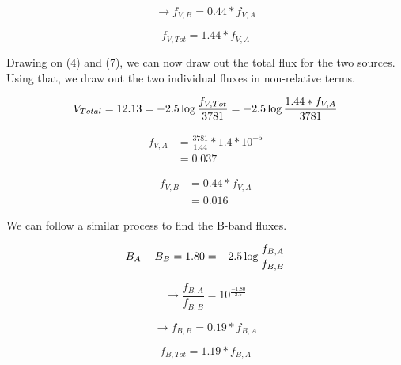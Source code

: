 \documentclass[12pt]{article}
\newenvironment{answer}[2][Answer]{\begin{trivlist}
\item[\hskip \labelsep {\bfseries #1}\hskip \labelsep {\bfseries #2.}]}{\end{trivlist}}
\begin{document}
\begin{answer}{2}
    $$ \rightarrow f_{V,B} = 0.44 * f_{V,A} $$

  \begin{equation}
    f_{V, Tot} = 1.44 * f_{V,A}
  \end{equation}




  Drawing on (4) and (7), we can now draw out the total flux for the two sources. Using that, we draw out the two individual fluxes in non-relative terms.

  $$  V_{Total}  = 12.13  = -2.5 \log{\frac{f_{V, Tot}}{3781}} \\
               = -2.5 \log{\frac{1.44 * f_{V,A}}{3781}} $$

  \begin{equation}
    \begin{align}
    f_{V,A} & = \frac{3781}{1.44} * 1.4 * 10^{-5} \\
            & = 0.037
    \end{align}
  \end{equation}

  \begin{equation}
    \begin{align}
      f_{V,B} & = 0.44 * f_{V,A} \\
              & = 0.016
    \end{align}
  \end{equation}

  We can follow a similar process to find the B-band fluxes.

  \begin{equation}
    B_{A} - B_{B} = 1.80 = -2.5 \log{\frac{f_{B,A}}{f_{B,B}}} \\
  \end{equation}

    $$ \rightarrow \frac{f_{B,A}}{f_{B,B}} = 10^{\frac{-1.80}{2.5}} $$

  $$ \rightarrow f_{B,B} = 0.19 * f_{B,A} $$

  \begin{equation}
    f_{B, Tot} = 1.19 * f_{B,A}
  \end{equation}



\end{answer}
\end{document}
